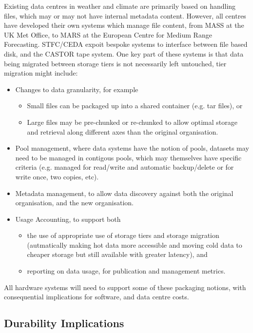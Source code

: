  Existing data centres in weather and climate
are primarily based on handling files, which may or may not have internal
metadata content.  However, all centres have developed their own systems which
manage file content, from MASS at the UK Met Office, to MARS at
the European Centre for Medium Range Forecasting. STFC/CEDA expoit bespoke
systems to interface between file based disk, and the CASTOR tape system.
One key part of these systems is that data being migrated between storage tiers
is not necessarily left untouched, tier migration might include:
\begin{itemize}
\item Changes to data granularity, for example
\begin{itemize}
    \item Small files can be packaged up into a shared container (e.g. tar files),
    or
    \item Large files may be pre-chunked or re-chunked to allow optimal
    storage and retrieval along different axes than the original organisation.
\end{itemize}
\item Pool management, where data systems have the notion of pools, datasets
may need to be managed in contigous pools, which may themselves have
specific criteria (e.g. managed for read/write and automatic backup/delete or for write once, two copies, etc).
\item Metadata management, to allow data discovery against both the
original organisation, and the new organisation.
\item Usage Accounting, to support both
\begin {itemize}
\item the use of appropriate use of storage tiers and storage migration (autmatically
making hot data more accessible and moving cold data to cheaper storage but
still available with greater latency), and
\item reporting on data usage, for publication and management metrics.
\end{itemize}
\end{itemize}
All hardware systems will need to support some of these packaging notions,
with consequential implications for software, and data centre costs.

\subsection{Durability Implications}
\label{sec:durab1}

